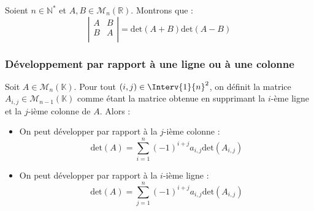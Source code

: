 \documentclass[a4paper,10pt]{report}
\begin{document}
\begin{ex} Soient $n \in \mathbb{N}^*$ et $A, B \in \mathcal{M}_n(\mathbb{R})$. Montrons que :
$$ \left\vert \begin{array}{cc}
A & B \\
B & A \\
\end{array}\right\vert= \textrm{det}(A+B) \textrm{det}(A-B)$$

\medskip

\vspace{8.5cm}
%
\end{ex}

\subsubsection{Développement par rapport à une ligne ou à une colonne}


\begin{prop} Soit $A \in \mathcal{M}_n(\mathbb{K})$. Pour tout $(i,j) \in  \Interv{1}{n}^2$, on définit la matrice $A_{i,j} \in  \mathcal{M}_{n-1}(\mathbb{K})$ comme étant la matrice obtenue en supprimant la $i$-ème ligne et la $j$-ième colonne de $A$. Alors :

\begin{itemize}
\item On peut développer par rapport à la $j$-ième colonne :
$$ \textrm{det}(A) = \sum_{i=1}^n (-1)^{i+j} a_{i,j} \textrm{det}(A_{i,j}) $$
\item On peut développer par rapport à la $i$-ième ligne :
$$ \textrm{det}(A) = \sum_{j=1}^n (-1)^{i+j} a_{i,j} \textrm{det}(A_{i,j}) $$
\end{itemize}
\end{prop}
\end{document}
